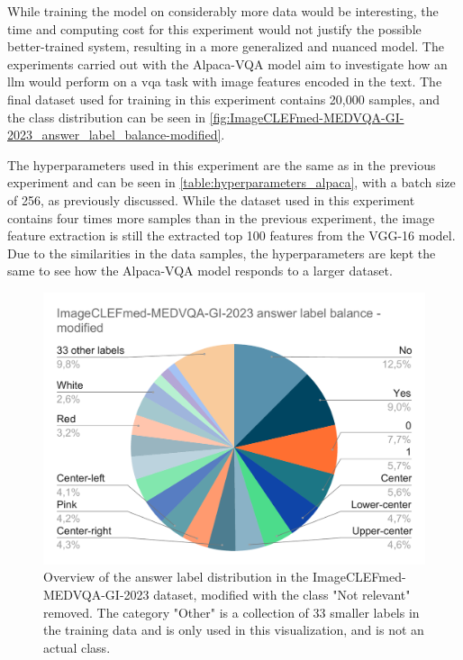     While training the model on considerably more data would be interesting, the time and computing cost for this experiment would not justify the possible better-trained system, resulting in a more generalized and nuanced model. The experiments carried out with the Alpaca-VQA model aim to investigate how an \gls{llm} would perform on a \gls{vqa} task with image features encoded in the text.
    The final dataset used for training in this experiment contains 20,000 samples, and the class distribution can be seen in \autoref{fig:ImageCLEFmed-MEDVQA-GI-2023_answer_label_balance-modified}.


    The hyperparameters used in this experiment are the same as in the previous experiment and can be seen in \autoref{table:hyperparameters_alpaca}, with a batch size of 256, as previously discussed. While the dataset used in this experiment contains four times more samples than in the previous experiment, the image feature extraction is still the extracted top 100 features from the VGG-16 model. 
    Due to the similarities in the data samples, the hyperparameters are kept the same to see how the Alpaca-VQA model responds to a larger dataset.
    
    
    \begin{figure}[htb]
        \centerline{
        \includegraphics[width=1.08\textwidth]{images/ImageCLEFmed-MEDVQA-GI-2023-answer-label-balance-modified.pdf}}
        \caption[Label distribution of answers in the modified dataset.]{Overview of the answer label distribution in the ImageCLEFmed-MEDVQA-GI-2023 dataset, modified with the class "Not relevant" removed. The category "Other" is a collection of 33 smaller labels in the training data and is only used in this visualization, and is not an actual class.}
        \label{fig:ImageCLEFmed-MEDVQA-GI-2023_answer_label_balance-modified}
    \end{figure} 

